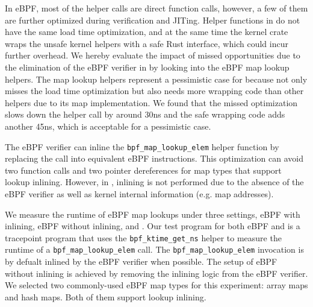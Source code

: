 In eBPF, most of the helper calls are direct function calls, however, a few of
    them are further optimized during verification and JITing.
Helper functions in \projname{} do not have the same load time optimization,
    and at the same time the kernel crate wraps the unsafe kernel helpers with
    a safe Rust interface, which could incur further overhead.
We hereby evaluate the impact of missed opportunities due to the elimination of
    the eBPF verifier in \projname{} by looking into the eBPF map lookup
    helpers.
The map lookup helpers represent a pessimistic case for \projname{} because
    \projname{} not only misses the load time optimization but also needs more
    wrapping code than other helpers due to its map implementation.
We found that the missed optimization slows down the helper call by around 30ns
    and the safe wrapping code adds another 45ns, which is acceptable for a
    pessimistic case.

The eBPF verifier can inline the \texttt{bpf\_map\_lookup\_elem}
    helper function by replacing the call into equivalent eBPF instructions.
This optimization can avoid two function calls and two pointer dereferences for
    map types that support lookup inlining.
However, in \projname{}, inlining is not performed due to the absence of the
    eBPF verifier as well as kernel internal information (e.g. map addresses).

We measure the runtime of eBPF map lookups under three
    settings, eBPF with inlining, eBPF without inlining, and \projname{}.
Our test program for both eBPF and \projname{} is a tracepoint program that
    uses the \texttt{bpf\_ktime\_get\_ns} helper to measure the runtime of
    a \texttt{bpf\_map\_lookup\_elem} call.
The \texttt{bpf\_map\_lookup\_elem} invocation is by defualt inlined by the
    eBPF verifier when possible.
The setup of eBPF without inlining is achieved by removing the inlining logic
    from the eBPF verifier.
We selected two commonly-used eBPF map types for this experiment: array maps
    and hash maps.
Both of them support lookup inlining.

